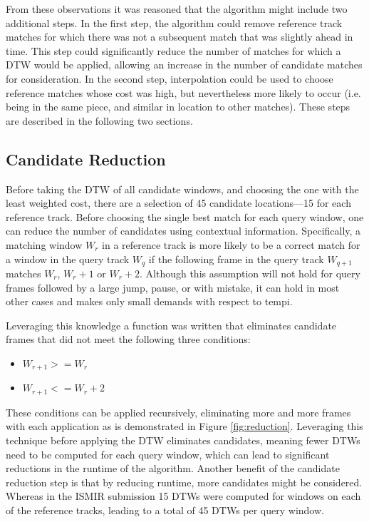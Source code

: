 \documentclass{article}
\begin{document}
From these observations it was reasoned that the algorithm might include two additional steps. In the first step, the algorithm could remove reference track matches for which there was not a subsequent match that was slightly ahead in time. This step could significantly reduce the number of matches for which a DTW would be applied, allowing an increase in the number of candidate matches for consideration. In the second step, interpolation could be used to choose reference matches whose cost was high, but nevertheless more likely to occur (i.e. being in the same piece, and similar in location to other matches). These steps are described in the following two sections.

\subsection{Candidate Reduction}
\label{sec:reduction}
Before taking the DTW of all candidate windows, and choosing the one with the least weighted cost, there are a selection of 45 candidate locations---15 for each reference track. Before choosing the single best match for each query window, one can reduce the number of candidates using contextual information.  Specifically, a matching window $W_r$ in a reference track is more likely to be a correct match for a window in the query track $W_q$ if the following frame in the query track $W_{q+1}$ matches $W_r$, $W_{r} + 1$ or $W_{r} + 2$. Although this assumption will not hold for query frames followed by a large jump, pause, or with mistake, it can hold in most other cases and makes only small demands with respect to tempi.

Leveraging this knowledge a function was written that eliminates candidate frames that did not meet the following three conditions:
\begin{itemize}
\item $W_{r+1} >= W_r$
\item $W_{r+1} <= W_r + 2$
\end{itemize}

These conditions can be applied recursively, eliminating more and more frames with each application as is demonstrated in Figure \ref{fig:reduction}.  Leveraging this technique before applying the DTW eliminates candidates, meaning fewer DTWs need to be computed for each query window, which can lead to significant reductions in the runtime of the algorithm. Another benefit of the candidate reduction step is that by reducing runtime, more candidates might be considered. Whereas in the ISMIR submission 15 DTWs were computed for windows on each of the reference tracks, leading to a total of 45 DTWs per query window. 
\end{document}
